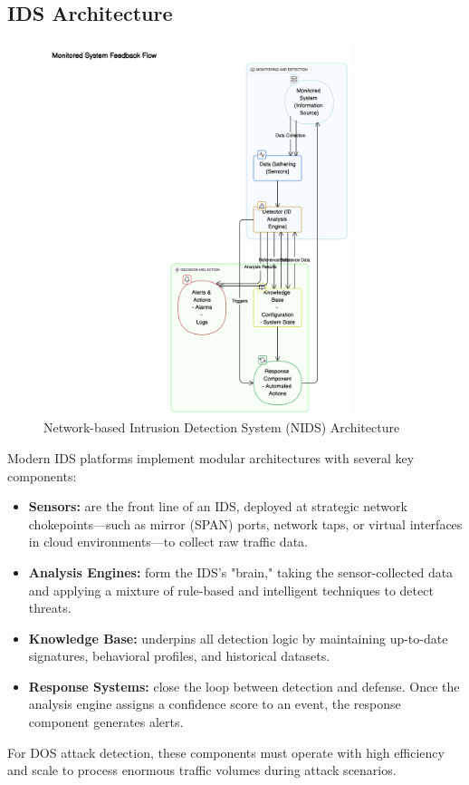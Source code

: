 \documentclass{report}
\begin{document}
\subsection{IDS Architecture}
\begin{figure}[H]
    \centering
    \includegraphics[width=0.8\textwidth]{images/ids-arch-diagram.png}
    \caption{Network-based Intrusion Detection System (NIDS) Architecture}
    \label{fig:nids-architecture}
\end{figure}

Modern IDS platforms implement modular architectures with several key components:
\begin{itemize}
    \item \textbf{Sensors:} are the front line of an IDS, deployed at strategic network chokepoints—such as mirror (SPAN) ports, network taps, or virtual interfaces in cloud environments—to collect raw traffic data.
    \item \textbf{Analysis Engines:} form the IDS's "brain," taking the sensor-collected data and applying a mixture of rule-based and intelligent techniques to detect threats.
    \item \textbf{Knowledge Base:} underpins all detection logic by maintaining up-to-date signatures, behavioral profiles, and historical datasets.
    \item \textbf{Response Systems:} close the loop between detection and defense. Once the analysis engine assigns a confidence score to an event, the response component generates alerts.
\end{itemize}
For DOS attack detection, these components must operate with high efficiency and scale to process enormous traffic volumes during attack scenarios.
\end{document}
